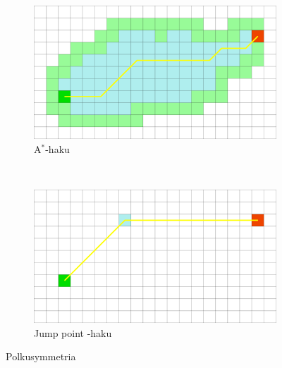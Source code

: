 \documentclass[finnish]{tktltiki2}
\theoremstyle{definition}
\theoremstyle{remark}
\begin{document}
\begin{figure}
  \centering
  \begin{subfigure}[h]{0.45\textwidth}
    \includegraphics[clip=true,trim = 8px 8px 8px 8px,width=\textwidth,keepaspectratio]{AStarSearch}
    \caption{A$^{\ast}$-haku}
    \label{fig:astarpathsymmetry}
  \end{subfigure}
  ~
  \begin{subfigure}[h]{0.45\textwidth}
    \includegraphics[clip=true,trim = 8px 8px 8px 8px,width=\textwidth,keepaspectratio]{JumpPointSearch}
    \caption{Jump point -haku}
  \end{subfigure}
  \caption{Polkusymmetria}
\end{figure}
\end{document}
